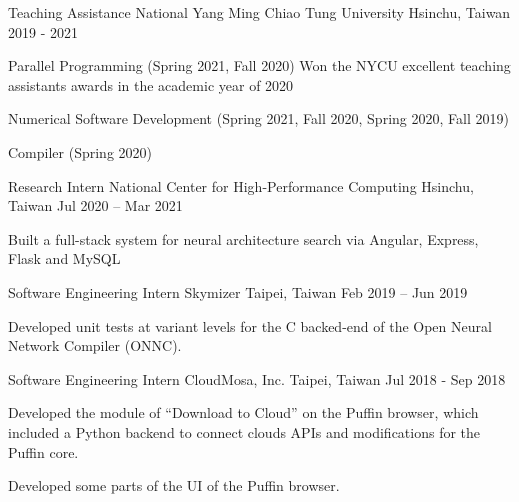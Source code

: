 

\begin{cventries}

  \cventry
    {Teaching Assistance} %
    {National Yang Ming Chiao Tung University} %
    {Hsinchu, Taiwan} %
    {2019 - 2021} %
    {
      \begin{cvitems} %
        \item {Parallel Programming (Spring 2021, Fall 2020) Won the NYCU excellent teaching assistants awards in the academic year of 2020}
        \item {Numerical Software Development (Spring 2021, Fall 2020, Spring 2020, Fall 2019)}
        \item {Compiler (Spring 2020)}
      \end{cvitems}
    }

  \cventry
    {Research Intern} %
    {National Center for High-Performance Computing} %
    {Hsinchu, Taiwan} %
    {Jul 2020 – Mar 2021} %
    {
      \begin{cvitems} %
        \item {Built a full-stack system for neural architecture search via Angular, Express, Flask and MySQL}
      \end{cvitems}
    }

  \cventry
    {Software Engineering Intern} %
    {Skymizer} %
    {Taipei, Taiwan} %
    {Feb 2019 – Jun 2019} %
    {
      \begin{cvitems} %
        \item {Developed unit tests at variant levels for the C backed-end of the Open Neural Network Compiler (ONNC).}
      \end{cvitems}
    }

  \cventry
    {Software Engineering Intern} %
    {CloudMosa, Inc.} %
    {Taipei, Taiwan} %
    {Jul 2018 - Sep 2018} %
    {
      \begin{cvitems} %
        \item {Developed the module of ``Download to Cloud'' on the Puffin browser, which included a Python backend to connect clouds APIs and modifications for the Puffin core.}
        \item {Developed some parts of the UI of the Puffin browser.}
      \end{cvitems}
    }


\end{cventries}
